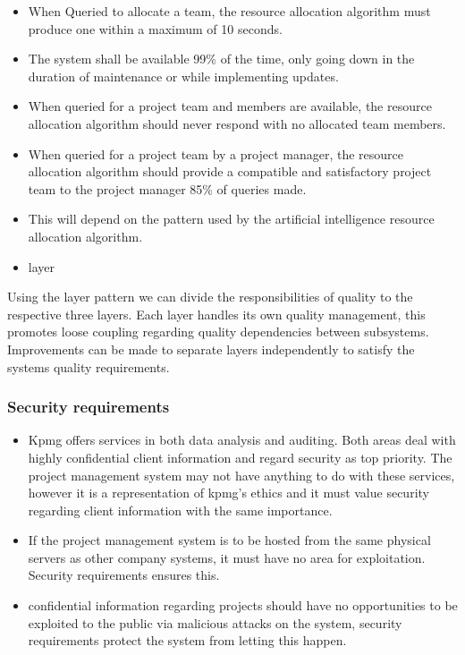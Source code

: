 \documentclass[a4paper,12pt]{article}
\begin{document}
	\textbf{  }
	\begin{itemize}
		\item When Queried to allocate a team, the resource allocation algorithm must produce one within a maximum of 10 seconds.
		
		\item The system shall be available 99\% of the time, only going down in the duration of maintenance or while implementing updates.
		
		\item When queried for a project team and members are available, the resource allocation algorithm should never respond with no allocated team members. 
		
		\item When queried for a project team by a project manager, the resource allocation algorithm should provide a compatible and satisfactory project team to the project manager 85\% of queries made. 
	\end{itemize}
	
	\begin{itemize}
		\item This will depend on the pattern used by the artificial intelligence resource allocation algorithm. 
		\item layer
	\end{itemize}
	Using the layer pattern we can divide the responsibilities of quality to the respective three layers. Each layer handles its own quality management, this promotes loose coupling regarding quality dependencies between subsystems. Improvements can be made to separate layers independently to satisfy the systems quality requirements.
	
	\subsubsection{Security requirements}
	\textbf{ }
	\begin{itemize}
		\item Kpmg offers services in both data analysis and auditing. Both areas deal with highly confidential client information and regard security as top priority. The project management system may not have anything to do with these services, however it is a representation of kpmg's ethics and it must value security regarding client information with the same importance.
		
		\item If the project management system is to be hosted from the same physical servers as other company systems, it must have no area for exploitation. Security requirements ensures this.
		
		\item confidential information regarding projects should have no opportunities to be exploited to the public via malicious attacks on the system, security requirements protect the system from letting this happen.  
	\end{itemize}
	
\end{document}
